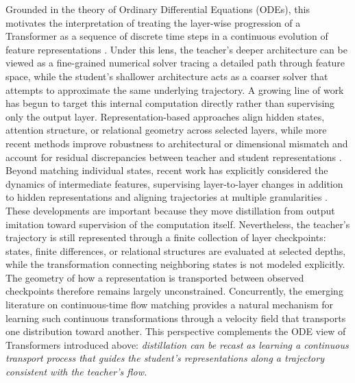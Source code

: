 \documentclass{article} %
\theoremstyle{definition}
\theoremstyle{remark}
\begin{document}
Grounded in the theory of Ordinary Differential Equations (ODEs), this motivates the interpretation of treating the layer-wise progression of a Transformer as a sequence of discrete time steps in a continuous evolution of feature representations \cite{chen2019neuralordinarydifferentialequations,tong2025neural}. Under this lens, the teacher's deeper architecture can be viewed as a fine-grained numerical solver tracing a detailed path through feature space, while the student's shallower architecture acts as a coarser solver that attempts to approximate the same underlying trajectory. A growing line of work has begun to target this internal computation directly rather than supervising only the output layer. Representation-based approaches align hidden states, attention structure, or relational geometry across selected layers, while more recent methods improve robustness to architectural or dimensional mismatch and account for residual discrepancies between teacher and student representations \cite{zhang2024dualspaceknowledgedistillationlarge,dasgupta2025improving,on2026knowledge}. Beyond matching individual states, recent work has explicitly considered the dynamics of intermediate features, supervising layer-to-layer changes in addition to hidden representations and aligning trajectories at multiple granularities \cite{gong-etal-2025-beyond,chi-etal-2026-mta}. These developments are important because they move distillation from output imitation toward supervision of the computation itself. Nevertheless, the teacher's trajectory is still represented through a finite collection of layer checkpoints: states, finite differences, or relational structures are evaluated at selected depths, while the transformation connecting neighboring states is not modeled explicitly. The geometry of how a representation is transported between observed checkpoints therefore remains largely unconstrained. Concurrently, the emerging literature on continuous-time flow matching \cite{lipman2023flowmatchinggenerativemodeling,liu2022flowstraightfastlearning} provides a natural mechanism for learning such continuous transformations through a velocity field that transports one distribution toward another. This perspective complements the ODE view of Transformers introduced above: \textit{distillation can be recast as learning a continuous transport process that guides the student's representations along a trajectory consistent with the teacher's flow.} 
\end{document}
